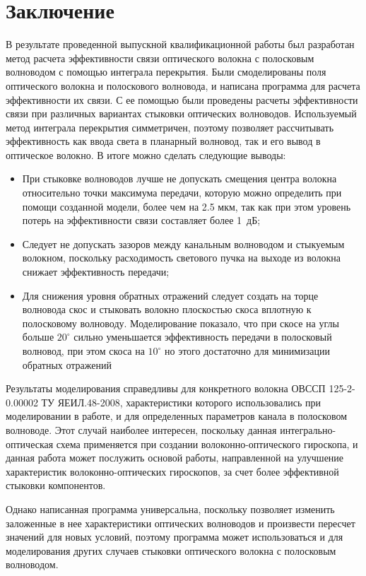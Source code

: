 \chapter*{Заключение}

В результате проведенной выпускной квалификационной работы был разработан метод расчета эффективности связи оптического волокна с полосковым волноводом с помощью интеграла перекрытия. Были смоделированы поля оптического волокна и полоскового волновода, и написана программа для расчета эффективности их связи. С ее помощью были проведены расчеты эффективности связи при различных вариантах стыковки оптических волноводов.
Используемый метод интеграла перекрытия симметричен, поэтому позволяет рассчитывать эффективность как ввода света в планарный волновод, так и его вывод в оптическое волокно. В итоге можно сделать следующие выводы:

\begin{itemize}
	\item При стыковке волноводов лучше не допускать смещения центра волокна относительно точки максимума передачи, которую можно определить при помощи созданной модели, более чем на 2.5 мкм, так как при этом уровень потерь на эффективности связи составляет более 1~дБ;
	\item Следует не допускать зазоров между канальным волноводом и стыкуемым волокном, поскольку расходимость светового пучка на выходе из волокна снижает эффективность передачи;
	\item Для снижения уровня обратных отражений следует создать на торце волновода скос и стыковать волокно плоскостью скоса вплотную к полосковому волноводу. Моделирование показало, что при скосе на углы больше $20^\circ$ сильно уменьшается эффективность передачи в полосковый волновод, при этом скоса на $10^\circ$ но этого достаточно для минимизации обратных отражений
\end{itemize}

Результаты моделирования справедливы для конкретного волокна ОВССП 125-2-0.00002 ТУ ЯЕИЛ.48-2008, характеристики которого использовались при моделировании в работе, и для определенных параметров канала в полосковом волноводе. Этот случай наиболее интересен, поскольку данная интегрально-оптическая схема применяется при создании волоконно-оптического гироскопа, и данная работа может послужить основой работы, направленной на улучшение характеристик волоконно-оптических гироскопов, за счет более эффективной стыковки компонентов.

Однако написанная программа универсальна, поскольку позволяет изменить заложенные в нее характеристики оптических волноводов и произвести пересчет значений для новых условий, поэтому программа может использоваться и для моделирования других случаев стыковки оптического волокна с полосковым волноводом.